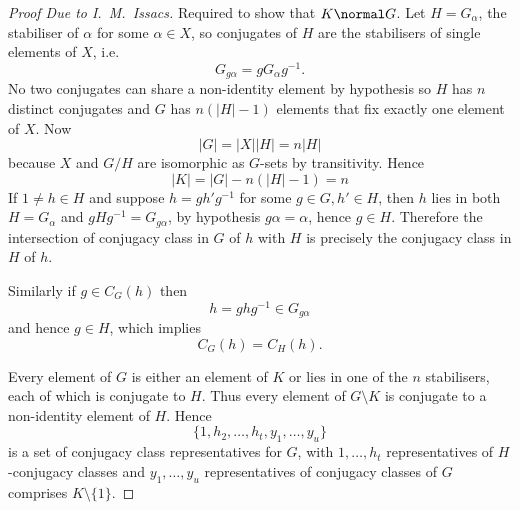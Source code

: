 \documentclass[a4paper]{article}
\theoremstyle{definition}
\begin{document}
\begin{proof}[Proof Due to I.\ M.\ Issacs]
  Required to show that \(K \normal G\). Let \(H = G_\alpha\), the stabiliser of \(\alpha\) for some \(\alpha \in X\), so conjugates of \(H\) are the stabilisers of single elements of \(X\), i.e.
  \[
    G_{g\alpha} = g G_\alpha g^{-1}.
  \]
  No two conjugates can share a non-identity element by hypothesis so \(H\) has \(n\) distinct conjugates and \(G\) has \(n (|H| - 1)\) elements that fix exactly one element of \(X\). Now
  \[
    |G| = |X| |H| = n |H|
  \]
  because \(X\) and \(G/H\) are isomorphic as \(G\)-sets by transitivity. Hence
  \[
    |K| = |G| - n (|H| - 1) = n
  \]
  If \(1 \neq h \in H\) and suppose \(h = g h' g^{-1}\) for some \(g \in G, h' \in H\), then \(h\) lies in both \(H = G_\alpha\) and \(gHg^{-1} = G_{g\alpha}\), by hypothesis \(g\alpha = \alpha\), hence \(g \in H\). Therefore the intersection of conjugacy class in \(G\) of \(h\) with \(H\) is precisely the conjugacy class in \(H\) of \(h\).

  Similarly if \(g \in C_G(h)\) then
  \[
    h = ghg^{-1} \in G_{g\alpha}
  \]
  and hence \(g \in H\), which implies
  \[
    C_G(h) = C_H(h).
  \]

  Every element of \(G\) is either an element of \(K\) or lies in one of the \(n\) stabilisers, each of which is conjugate to \(H\). Thus every element of \(G \setminus K\) is conjugate to a non-identity element of \(H\). Hence
  \[
    \{1, h_2, \dots, h_t, y_1, \dots, y_u\}
  \]
  is a set of conjugacy class representatives for \(G\), with \(1, \dots, h_t\) representatives of \(H\)-conjugacy classes and \(y_1, \dots, y_u\) representatives of conjugacy classes of \(G\) comprises \(K \setminus \{1\}\).


\end{proof}
\end{document}
